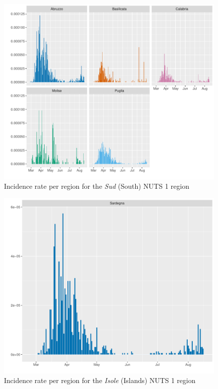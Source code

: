 \documentclass[12pt]{article}
\begin{document}
\begin{appendices}
    	\begin{figure}[H]
    	    \centering
    	    \includegraphics[width=\textwidth]{output/infective_rates_Sud.pdf}
    	    \caption{Incidence rate per region for the \textit{Sud} (South) NUTS 1 region}
    	    \label{fig:incidence_sud}
    	\end{figure}
    	
    	\begin{figure}[H]
    	    \centering
    	    \includegraphics[width=\textwidth]{output/infective_rates_Isole.pdf}
    	    \caption{Incidence rate per region for the \textit{Isole} (Islands) NUTS 1 region}
    	    \label{fig:incidence_isole}
    	\end{figure}
		

\end{appendices}
\end{document}
